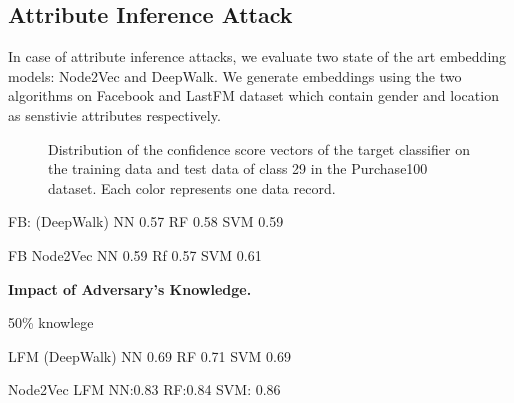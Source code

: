 \subsection{Attribute Inference Attack}

In case of attribute inference attacks, we evaluate two state of the art embedding models: Node2Vec and DeepWalk.
We generate embeddings using the two algorithms on Facebook and LastFM dataset which contain gender and location as senstivie attributes respectively.


\begin{figure}
    \centering
    \begin{minipage}[b]{1\linewidth}
    \centering

    \end{minipage}
    \caption{Distribution of the confidence score vectors of the target classifier on the training data and test data of class 29 in the Purchase100 dataset. Each color represents one data record.}
    \label{fig:soft_label}
\end{figure}

FB: (DeepWalk)
NN  0.57
RF 0.58
SVM 0.59

FB Node2Vec
NN 0.59
Rf 0.57
SVM 0.61

\textbf{Impact of Adversary's Knowledge.}

50\% knowlege

LFM (DeepWalk)
NN 0.69
RF 0.71
SVM 0.69


Node2Vec
LFM
NN:0.83
RF:0.84
SVM: 0.86
